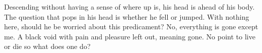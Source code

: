 \begin{Document}
        Descending without having a sense of where up is, his head is ahead of his body. The question that pops in his head is whether he fell
    or jumped. With nothing here, should he be worried about this predicament? No, everything is gone except me. A black void with pain and 
    pleasure left out, meaning gone. No point to live or die so what does one do?

        

    
\end{Document}
